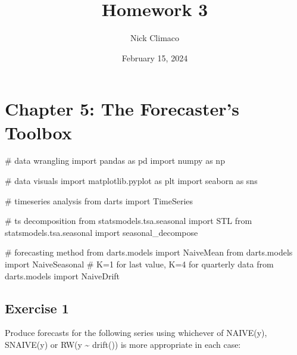\documentclass[
  11pt,
]{article}
\title{Homework 3}
\author{Nick Climaco}
\date{February 15, 2024}
\newenvironment{Shaded}{\begin{snugshade}}{\end{snugshade}}
\newcommand{\CommentTok}[1]{\textcolor[rgb]{0.37,0.37,0.37}{#1}}
\newcommand{\ImportTok}[1]{\textcolor[rgb]{0.00,0.46,0.62}{#1}}
\newcommand{\NormalTok}[1]{\textcolor[rgb]{0.00,0.23,0.31}{#1}}
\renewcommand*\contentsname{Table of contents}
\newcommand\contentsname{Table of contents}
\begin{document}
\maketitle


\renewcommand*\contentsname{Table of contents}
{
\hypersetup{linkcolor=}
\setcounter{tocdepth}{3}
\tableofcontents
}
\newpage

\section{Chapter 5: The Forecaster's
Toolbox}\label{chapter-5-the-forecasters-toolbox}

\begin{Shaded}
\begin{Highlighting}[]
\CommentTok{\# data wrangling }
\ImportTok{import}\NormalTok{ pandas }\ImportTok{as}\NormalTok{ pd }
\ImportTok{import}\NormalTok{ numpy }\ImportTok{as}\NormalTok{ np}

\CommentTok{\# data visuals}
\ImportTok{import}\NormalTok{ matplotlib.pyplot }\ImportTok{as}\NormalTok{ plt }
\ImportTok{import}\NormalTok{ seaborn }\ImportTok{as}\NormalTok{ sns}

\CommentTok{\# timeseries analysis}
\ImportTok{from}\NormalTok{ darts }\ImportTok{import}\NormalTok{ TimeSeries}

\CommentTok{\# ts decomposition}
\ImportTok{from}\NormalTok{ statsmodels.tsa.seasonal }\ImportTok{import}\NormalTok{ STL}
\ImportTok{from}\NormalTok{ statsmodels.tsa.seasonal }\ImportTok{import}\NormalTok{ seasonal\_decompose}

\CommentTok{\# forecasting method}
\ImportTok{from}\NormalTok{ darts.models }\ImportTok{import}\NormalTok{ NaiveMean}
\ImportTok{from}\NormalTok{ darts.models }\ImportTok{import}\NormalTok{ NaiveSeasonal }\CommentTok{\# K=1 for last value, K=4 for quarterly data}
\ImportTok{from}\NormalTok{ darts.models }\ImportTok{import}\NormalTok{ NaiveDrift}
\end{Highlighting}
\end{Shaded}

\subsection{Exercise 1}\label{exercise-1}

Produce forecasts for the following series using whichever of NAIVE(y),
SNAIVE(y) or RW(y \textasciitilde{} drift()) is more appropriate in each
case:
\end{document}
